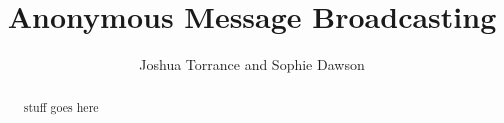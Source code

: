 \documentclass[times,11pt,a4]{article}
\title{Anonymous Message Broadcasting}
\author{Joshua Torrance and Sophie Dawson}
\date{}
\begin{document}
\maketitle

\begin{abstract}
%
stuff goes here
\end{abstract}




%
%
%
\end{document}
